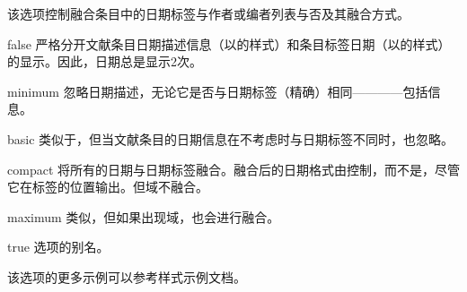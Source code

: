 \begin{optionlist}



该选项控制融合条目中的日期标签与作者或编者列表与否及其融合方式。

\begin{valuelist}
\item[false] %
    严格分开文献条目日期描述信息（以的样式）和条目标签日期（以的样式）的显示。因此，日期总是显示2次。

\item[minimum] %
    忽略日期描述，无论它是否与日期标签（精确）相同————包括信息。


\item[basic] %
    类似于，但当文献条目的日期信息在不考虑时与日期标签不同时，也忽略。


\item[compact] %
    将所有的日期与日期标签融合。融合后的日期格式由控制，而不是，尽管它在标签的位置输出。但域不融合。

\item[maximum] %
    类似，但如果出现域，也会进行融合。

\item[true] %
    选项的别名。

\end{valuelist}

该选项的更多示例可以参考样式示例文档。
\end{optionlist}

